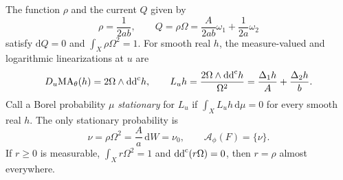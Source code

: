 \begin{theorem}\label{thm:singular-product-full-adjoint}
The function $\rho$ and the current $Q$ given by
\[
 \rho=\frac1{2ab},\qquad
 Q=\rho\Omega=\frac{A}{2ab}\omega_1+\frac1{2a}\omega_2
\]
satisfy $\mathrm{d}Q=0$ and $\int_X\rho\Omega^2=1$. For smooth real $h$, the measure-valued and logarithmic linearizations at $u$ are
\[
 D_u\mathrm{MA}_\theta(h)=2\Omega\wedge\mathrm{dd}^{\mathrm{c}} h,\qquad
 L_uh=\frac{2\Omega\wedge\mathrm{dd}^{\mathrm{c}} h}{\Omega^2}
        =\frac{\Delta_1h}{A}+\frac{\Delta_2h}{b}.
\]
Call a Borel probability $\mu$ \emph{stationary} for $L_u$ if $\int_XL_uh\,\mathrm{d}\mu=0$ for every smooth real $h$. The only stationary probability is
\begin{equation}\label{eq:singular-product-full-support}
 \nu=\rho\Omega^2=\frac Aa\,\mathrm{d}W=\nu_0,\qquad
 \mathcal A_\phi(F)=\{\nu\}.
\end{equation}
If $r\geq0$ is measurable, $\int_Xr\Omega^2=1$ and $\mathrm{dd}^{\mathrm{c}}(r\Omega)=0$, then $r=\rho$ almost everywhere.
\end{theorem}
